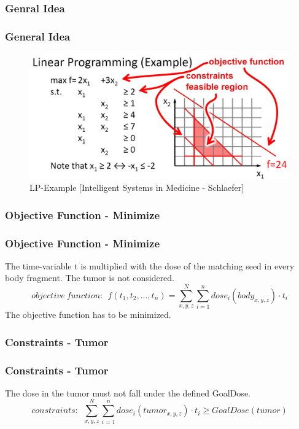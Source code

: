 \documentclass{beamer}
\begin{document}
 \subsubsection{Genral Idea}
 \begin{frame}
 \frametitle{General Idea}
 \begin{figure}[h] 
  \centering
     \includegraphics[width=1\textwidth]{pictures/LPexample.JPG}
  \caption{LP-Example [Intelligent Systems in Medicine - Schlaefer]}
  \label{fig:LPE}
\end{figure}
 \end{frame}
 
 \subsubsection{Objective Function - Minimize}
 \begin{frame}
 \frametitle{Objective Function - Minimize}
 The time-variable t is multiplied with the dose of the matching seed in every body fragment. The tumor is not considered.
 \begin{equation}
 \label{eq:lp}
 objective \ function: \ \ f(t_{1}, t_{2}, ... ,t_{n}) = 
 \sum_{x,y,z}^N \sum_{i=1}^n dose_{i}(body_{x,y,z}) \cdot t_{i}
 \end{equation}
 The objective function has to be minimized.
 \end{frame}
 
 \subsubsection{Constraints - Tumor}
 \begin{frame}
 \frametitle{Constraints - Tumor}
 The dose in the tumor must not fall under the defined GoalDose.
 \begin{equation}
 \label{eq:constr}
 constraints: \ \ \sum_{x,y,z}^N \sum_{i=1}^n dose_{i}(tumor_{x,y,z}) \cdot t_{i} \ge GoalDose(tumor)
 \end{equation}
 \end{frame}
 
\end{document}
